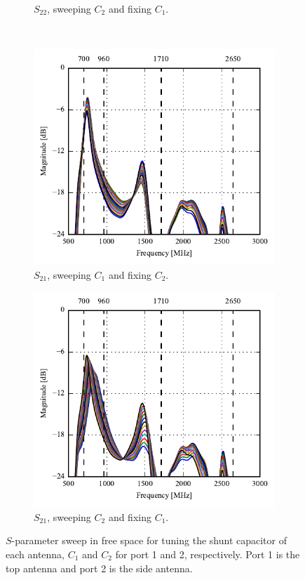 \begin{figure}[htbp]
\begin{subfigure}[b]{0.49\linewidth}
        \caption{$S_{22}$, sweeping $C_2$ and fixing $C_1$.}
    \end{subfigure}
~
    \begin{subfigure}[b]{0.49\linewidth}
        \centering
        \includegraphics{img/tech_sol/monopole/s21-s11}
        \caption{$S_{21}$, sweeping $C_1$ and fixing $C_2$.}
    \end{subfigure}
    \hfill
    \begin{subfigure}[b]{0.49\linewidth}
        \centering
        \includegraphics{img/tech_sol/monopole/s21-s22}
        \caption{$S_{21}$, sweeping $C_2$ and fixing $C_1$.}
    \end{subfigure}
    \caption{$S$-parameter sweep in free space for tuning the shunt capacitor of each antenna, $C_1$ and $C_2$ for port 1 and 2, respectively. Port 1 is the top antenna and port 2 is the side antenna.}
    \label{fig:sparam_mono_free_space}
\end{figure}

